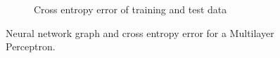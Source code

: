 \documentclass[../main.tex]{subfiles}
\begin{document}
\begin{figure}
\begin{subfigure}[b]{0.48\textwidth}
        \caption{Cross entropy error of training and test data}
        \label{fig:cee}
    \end{subfigure}
    \caption{Neural network graph and cross entropy error for a Multilayer Perceptron.}
\end{figure}
\end{document}
